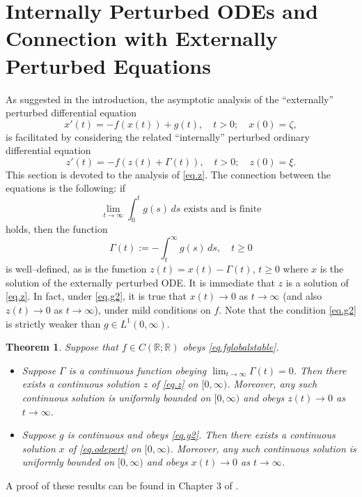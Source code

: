 \documentclass[a4paper,10pt,reqno]{amsart}
\numberwithin{equation}{section}
\newtheorem{theorem}{Theorem}
\theoremstyle{definition}
\theoremstyle{remark}
\DeclareMathOperator{\1}{\mathbbm 1}
\begin{document}
	\section{Internally Perturbed ODEs and Connection with Externally Perturbed Equations}
	As suggested in the introduction, the asymptotic analysis of the ``externally'' perturbed differential equation 
	\[
	x'(t)=-f(x(t))+g(t), \quad t>0; \quad x(0)=\zeta,
	\]
	is facilitated by considering the related ``internally'' perturbed ordinary differential equation 
	\begin{equation} \label{eq.z}
		z'(t)=-f(z(t)+\Gamma(t)), \quad t>0; \quad z(0)=\xi.
	\end{equation}
	This section is devoted to the analysis of \eqref{eq.z}. The connection between the equations is the following: if 
	\begin{equation} \label{eq.g2}
		\lim_{t\to\infty} \int_0^t g(s)\,ds \text{ exists and is finite}
	\end{equation}
	holds, then the function 
	\begin{equation} \label{eq:Gamma}
		\Gamma(t):=-\int_t^\infty g(s)\,ds, \quad t\geq 0
	\end{equation}
	is well--defined, as is the function $z(t)=x(t)-\Gamma(t)$, $t\geq 0$ where $x$ is the solution of the externally perturbed ODE. It is immediate that $z$ is a solution of \eqref{eq.z}. In fact, under \eqref{eq.g2}, it is true that $x(t)\to 0$ as $t\to\infty$ (and also $z(t)\to 0$ as $t\to\infty$), under mild conditions on $f$. Note that the condition \eqref{eq.g2} is strictly weaker than $g\in L^1(0,\infty)$.
	\begin{theorem} \label{thm.xto0zto0}
		Suppose that $f\in C(\mathbb{R};\mathbb{R})$ obeys \eqref{eq.fglobalstable}. 
		\begin{itemize}
			\item[(a)] Suppose $\Gamma$ is a continuous function obeying $\lim_{t \to \infty}\Gamma(t) = 0$. Then there exists a continuous solution $z$ of \eqref{eq.z} on $[0,\infty)$. Moreover, any such continuous solution is uniformly bounded on $[0,\infty)$ and obeys $z(t)\to 0$ as $t\to\infty$. 
			\item[(b)] Suppose $g$ is continuous and obeys \eqref{eq.g2}. 
			Then there exists a continuous solution $x$ of \eqref{eq.odepert} on $[0,\infty)$. Moreover, any such continuous solution is uniformly bounded on $[0,\infty)$ and obeys $x(t)\to 0$ as $t\to\infty$. 
		\end{itemize} 
	\end{theorem}   
	A proof of these results can be found in Chapter 3 of \cite{tahanithesis}.
	
\end{document}
